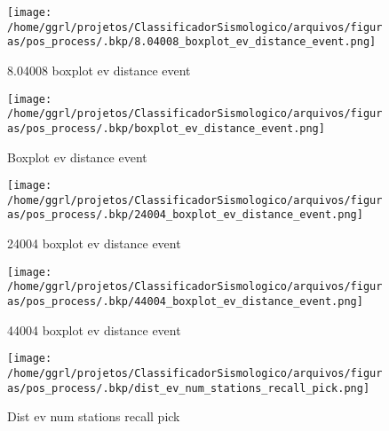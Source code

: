                     \begin{figure}[H]
                        \centering
                        \texttt{[image: /home/ggrl/projetos/ClassificadorSismologico/arquivos/figuras/pos\_process/.bkp/8.04008\_boxplot\_ev\_distance\_event.png]}
                        \caption{8.04008 boxplot ev distance event}
                        \label{fig:8.04008_boxplot_ev_distance_event}
                    \end{figure}
                

                    \begin{figure}[H]
                        \centering
                        \texttt{[image: /home/ggrl/projetos/ClassificadorSismologico/arquivos/figuras/pos\_process/.bkp/boxplot\_ev\_distance\_event.png]}
                        \caption{Boxplot ev distance event}
                        \label{fig:boxplot_ev_distance_event}
                    \end{figure}
                

                    \begin{figure}[H]
                        \centering
                        \texttt{[image: /home/ggrl/projetos/ClassificadorSismologico/arquivos/figuras/pos\_process/.bkp/24004\_boxplot\_ev\_distance\_event.png]}
                        \caption{24004 boxplot ev distance event}
                        \label{fig:24004_boxplot_ev_distance_event}
                    \end{figure}
                

                    \begin{figure}[H]
                        \centering
                        \texttt{[image: /home/ggrl/projetos/ClassificadorSismologico/arquivos/figuras/pos\_process/.bkp/44004\_boxplot\_ev\_distance\_event.png]}
                        \caption{44004 boxplot ev distance event}
                        \label{fig:44004_boxplot_ev_distance_event}
                    \end{figure}
                

                    \begin{figure}[H]
                        \centering
                        \texttt{[image: /home/ggrl/projetos/ClassificadorSismologico/arquivos/figuras/pos\_process/.bkp/dist\_ev\_num\_stations\_recall\_pick.png]}
                        \caption{Dist ev num stations recall pick}
                        \label{fig:dist_ev_num_stations_recall_pick}
                    \end{figure}
                

